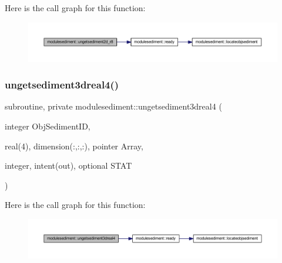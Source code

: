 Here is the call graph for this function\+:\nopagebreak
\begin{figure}[H]
\begin{center}
\leavevmode
\includegraphics[width=350pt]{namespacemodulesediment_aea72603e1507bed2899b17d9e29b67c9_cgraph}
\end{center}
\end{figure}
\mbox{\label{namespacemodulesediment_aa228482586fe3192bde62eb98f474300}} 
\subsubsection{\texorpdfstring{ungetsediment3dreal4()}{ungetsediment3dreal4()}}
{\footnotesize\ttfamily subroutine, private modulesediment\+::ungetsediment3dreal4 (\begin{DoxyParamCaption}\item[{integer}]{Obj\+Sediment\+ID,  }\item[{real(4), dimension(\+:,\+:,\+:), pointer}]{Array,  }\item[{integer, intent(out), optional}]{S\+T\+AT }\end{DoxyParamCaption})\hspace{0.3cm}{\ttfamily [private]}}

Here is the call graph for this function\+:\nopagebreak
\begin{figure}[H]
\begin{center}
\leavevmode
\includegraphics[width=350pt]{namespacemodulesediment_aa228482586fe3192bde62eb98f474300_cgraph}
\end{center}
\end{figure}
\mbox{\label{namespacemodulesediment_abf1b5c58352a7fda2565c80929e6e099}} 

